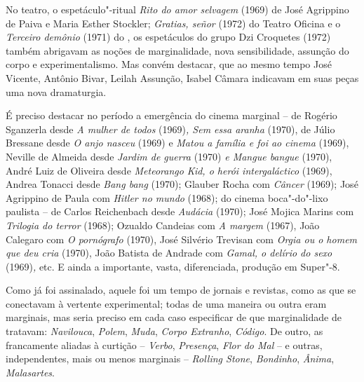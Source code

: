 No teatro, o espetáculo"-ritual \emph{Rito do amor selvagem} (1969) de
José Agrippino de Paiva e Maria Esther Stockler; \emph{Gratias, señor}
(1972) do Teatro Oficina e o \emph{Terceiro demônio} (1971) do , os
espetáculos do grupo Dzi Croquetes (1972) também abrigavam as noções de
marginalidade, nova sensibilidade, assunção do corpo e experimentalismo.
Mas convém destacar, que ao mesmo tempo José Vicente, Antônio Bivar,
Leilah Assunção, Isabel Câmara indicavam em suas peças uma nova
dramaturgia.

É preciso destacar no período a emergência do cinema marginal -- de
Rogério Sganzerla desde \emph{A mulher de todos} (1969)\emph{, Sem essa
aranha} (1970), de Júlio Bressane desde \emph{O anjo nasceu} (1969) e
\emph{Matou a família e foi ao cinema} (1969), Neville de Almeida desde
\emph{Jardim de guerra} (1970) \emph{e Mangue bangue} (1970), André Luiz
de Oliveira desde \emph{Meteorango Kid, o herói intergaláctico} (1969),
Andrea Tonacci desde \emph{Bang bang} (1970); Glauber Rocha com
\emph{Câncer} (1969); José Agrippino de Paula com \emph{Hitler no 
mundo} (1968); do cinema boca"-do"-lixo paulista -- de Carlos Reichenbach
desde \emph{Audácia} (1970); José Mojica Marins com \emph{Trilogia do
terror} (1968); Ozualdo Candeias com \emph{A margem} (1967), João
Calegaro com \emph{O pornógrafo} (1970), José Silvério Trevisan com
\emph{Orgia ou o homem que deu cria} (1970), João Batista de Andrade com
\emph{Gamal, o delírio do sexo} (1969)\emph{,} etc. E ainda a
importante, vasta, diferenciada, produção em Super"-8.

Como já foi assinalado, aquele foi um tempo de jornais e revistas, como
as que se conectavam à vertente experimental; todas de uma maneira ou
outra eram marginais, mas seria preciso em cada caso especificar de que
marginalidade de tratavam: \emph{Navilouca}, \emph{Polem}, \emph{Muda}, \emph{Corpo Extranho},
\emph{Código}. De outro, as francamente aliadas à curtição -- \emph{Verbo},
\emph{Presença}, \emph{Flor do Mal} -- e outras, independentes, mais ou menos
marginais -- \emph{Rolling Stone}, \emph{Bondinho}, \emph{Ânima}, \emph{Malasartes}.

